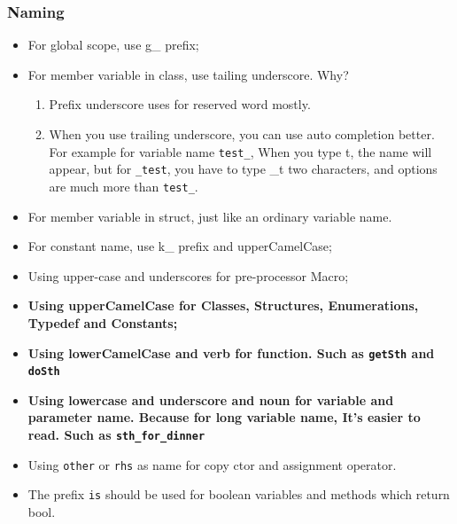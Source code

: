 \documentclass[a4paper,12pt,twoside]{book}
\begin{document}
\subsubsection{Naming}
\begin{itemize}
	
	\item For global scope, use g\_ prefix;
	
	\item For member variable in class, use tailing underscore. Why? 
	\begin{enumerate}
		\item Prefix underscore uses for reserved word mostly.
		\item When you use trailing underscore, you can use auto completion better. For example for variable name \texttt{test\_}, When you type t, the name will appear, but for \texttt{\_test}, you have to type \_t two characters, and options are much more than \texttt{test\_}.
	\end{enumerate}
	
	\item For member variable in struct, just like an ordinary variable name. 
	
	\item For constant name, use k\_ prefix and upperCamelCase;
	
	\item Using upper-case and underscores for pre-processor Macro;
	
	\item \textbf{Using upperCamelCase for Classes, Structures, Enumerations, Typedef and  Constants;}
	
	\item \textbf{Using lowerCamelCase and verb for function. Such as \texttt{getSth} and \texttt{doSth}}
	
	\item \textbf{Using lowercase and underscore  and noun for variable and parameter name. Because for long variable name, It's easier to read. Such as \texttt{sth\_for\_dinner}}
	
	\item Using \texttt{other} or \texttt{rhs} as name for copy ctor and assignment operator.
	
	\item The prefix \texttt{is} should be used for boolean variables and methods which return bool.
	
\end{itemize}
\end{document}
